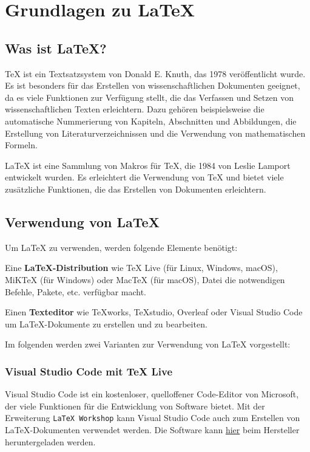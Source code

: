 \section{Grundlagen zu \LaTeX{}}
\label{sec:grundlagen}

\subsection{Was ist \LaTeX{}?}
\label{sec:was_ist_latex}

\TeX{} ist ein Textsatzsystem von Donald E. Knuth, das 1978 veröffentlicht wurde. Es ist besonders für das Erstellen von wissenschaftlichen Dokumenten geeignet, da es viele Funktionen zur Verfügung stellt, die das Verfassen und Setzen von wissenschaftlichen Texten erleichtern. Dazu gehören beispielsweise die automatische Nummerierung von Kapiteln, Abschnitten und Abbildungen, die Erstellung von Literaturverzeichnissen und die Verwendung von mathematischen Formeln.

\LaTeX{} ist eine Sammlung von Makros für \TeX{}, die 1984 von Leslie Lamport entwickelt wurden. Es erleichtert die Verwendung von \TeX{} und bietet viele zusätzliche Funktionen, die das Erstellen von Dokumenten erleichtern.


\subsection{Verwendung von \LaTeX{}}
\label{sec:verwendung_von_latex}
Um \LaTeX{} zu verwenden, werden folgende Elemente benötigt:

Eine \textbf{\LaTeX{}-Distribution} wie TeX Live (für Linux, Windows, macOS), MiKTeX (für Windows) oder MacTeX (für macOS), Datei die notwendigen Befehle, Pakete, etc. verfügbar macht.

Einen \textbf{Texteditor} wie TeXworks, TeXstudio, Overleaf oder Visual Studio Code um \LaTeX{}-Dokumente zu erstellen und zu bearbeiten.

Im folgenden werden zwei Varianten zur Verwendung von \LaTeX{} vorgestellt:

\subsubsection{Visual Studio Code mit TeX Live}
\label{sec:visual_studio_code_mit_tex_live}
Visual Studio Code ist ein kostenloser, quelloffener Code-Editor von Microsoft, der viele Funktionen für die Entwicklung von Software bietet. Mit der Erweiterung \texttt{LaTeX Workshop} kann Visual Studio Code auch zum Erstellen von \LaTeX{}-Dokumenten verwendet werden. Die Software kann \href{https://code.visualstudio.com/Download}{hier} beim Hersteller heruntergeladen werden.

